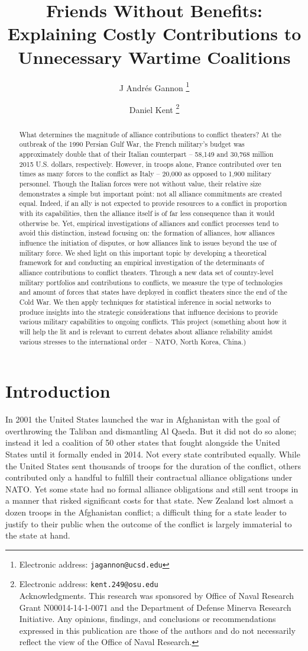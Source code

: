 \documentclass[12pt,letterpaper]{article}
\title{Friends Without Benefits: Explaining Costly Contributions to Unnecessary Wartime Coalitions}
\author{J Andr\'{e}s Gannon%
	\thanks{Electronic address: \texttt{jagannon@ucsd.edu}}}
\affil{Department of Political Science \\ University of California, San Diego}
\author{Daniel Kent%
	\thanks{Electronic address: \texttt{kent.249@osu.edu} \\ Acknowledgments. This research was sponsored by Office of Naval Research Grant N00014-14-1-0071 and the Department of Defense Minerva Research Initiative. Any opinions, findings, and conclusions or recommendations expressed in this publication are those of the authors and do not necessarily reflect the view of the Office of Naval Research.}}
\affil{Department of Political Science \\ Ohio State University}
\begin{document}
\maketitle

\begin{abstract}
What determines the magnitude of alliance contributions to conflict theaters? At the outbreak of the 1990 Persian Gulf War, the French military's budget was approximately double that of their Italian counterpart -- 58,149 and 30,768 million 2015 U.S. dollars, respectively. However, in troops alone, France contributed over ten times as many forces to the conflict as Italy -- 20,000 as opposed to 1,900 military personnel. Though the Italian forces were not without value, their relative size demonstrates a simple but important point: not all alliance commitments are created equal. Indeed, if an ally is not expected to provide resources to a conflict in proportion with its capabilities, then the alliance itself is of far less consequence than it would otherwise be. Yet, empirical investigations of alliances and conflict processes tend
to avoid this distinction, instead focusing on: the formation of alliances, how alliances influence the initiation of disputes, or how alliances link to issues beyond the use of military force. We shed light on this important topic by developing a theoretical framework for and conducting an empirical investigation of the determinants of alliance contributions to conflict theaters. Through a new data set of country-level military portfolios and contributions to conflicts, we measure the type of technologies and amount of forces that states have deployed in conflict theaters since the end of the Cold War. We then apply techniques for statistical inference in social networks to produce insights into the strategic considerations that influence decisions to provide various military capabilities to ongoing conflicts. This project (something about how it will help the lit and is relevant to current debates about alliance reliability amidst various stresses to the international order -- NATO, North Korea, China.)
\end{abstract}

\section{Introduction}
	In 2001 the United States launched the war in Afghanistan with the goal of overthrowing the Taliban and dismantling Al Qaeda. But it did not do so alone; instead it led a coalition of 50 other states that fought alongside the United States until it formally ended in 2014. Not every state contributed equally. While the United States sent thousands of troops for the duration of the conflict, others contributed only a handful to fulfill their contractual alliance obligations under NATO. Yet some state had no formal alliance obligations and still sent troops in a manner that risked significant costs for that state. New Zealand lost almost a dozen troops in the Afghanistan conflict; a difficult thing for a state leader to justify to their public when the outcome of the conflict is largely immaterial to the state at hand.
	
\end{document}
